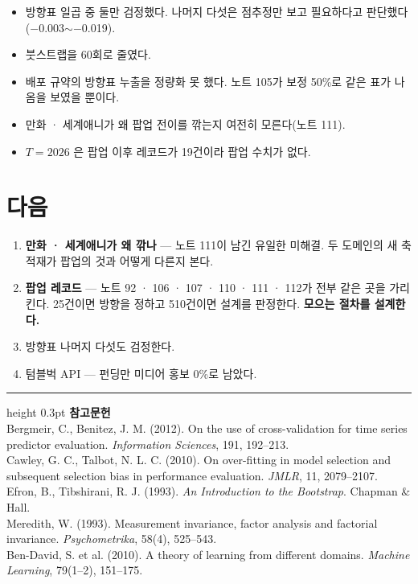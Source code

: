 \documentclass[10pt]{article}
\begin{document}
\begin{itemize}[leftmargin=1.1em,itemsep=0.15em]
\item 방향표 일곱 중 둘만 검정했다. 나머지 다섯은 점추정만 보고 필요하다고
      판단했다($-$0.003$\sim-$0.019).
\item 붓스트랩을 60회로 줄였다.
\item 배포 규약의 방향표 누출을 정량화 못 했다. 노트 105가 보정 50\%로 같은
      표가 나옴을 보였을 뿐이다.
\item 만화 · 세계애니가 왜 팝업 전이를 깎는지 여전히 모른다(노트 111).
\item $T{=}2026$ 은 팝업 이후 레코드가 19건이라 팝업 수치가 없다.
\end{itemize}

\section{다음}

\begin{enumerate}[leftmargin=1.3em,itemsep=0.15em]
\item \textbf{만화 · 세계애니가 왜 깎나} --- 노트 111이 남긴 유일한 미해결.
      두 도메인의 새 축 적재가 팝업의 것과 어떻게 다른지 본다.
\item \textbf{팝업 레코드} --- 노트 92 · 106 · 107 · 110 · 111 · 112가 전부
      같은 곳을 가리킨다. 25건이면 방향을 정하고 510건이면 설계를 판정한다.
      \textbf{모으는 절차를 설계한다.}
\item 방향표 나머지 다섯도 검정한다.
\item 텀블벅 API --- 펀딩만 미디어 홍보 0\%로 남았다.
\end{enumerate}

\vspace{0.6em}
\hrule height 0.3pt
\vspace{0.5em}
{\footnotesize
\textbf{참고문헌}\\[0.3em]
Bergmeir, C., Benitez, J. M. (2012). On the use of cross-validation for time
series predictor evaluation. \emph{Information Sciences}, 191, 192--213.\\[0.15em]
Cawley, G. C., Talbot, N. L. C. (2010). On over-fitting in model selection and
subsequent selection bias in performance evaluation. \emph{JMLR}, 11, 2079--2107.\\[0.15em]
Efron, B., Tibshirani, R. J. (1993). \emph{An Introduction to the Bootstrap}.
Chapman \& Hall.\\[0.15em]
Meredith, W. (1993). Measurement invariance, factor analysis and factorial
invariance. \emph{Psychometrika}, 58(4), 525--543.\\[0.15em]
Ben-David, S. et al. (2010). A theory of learning from different domains.
\emph{Machine Learning}, 79(1--2), 151--175.
}
\end{document}
